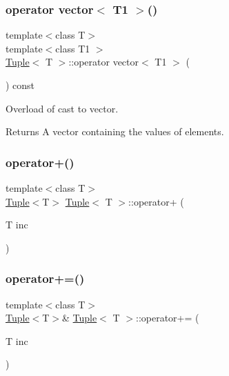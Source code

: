 \mbox{\label{class_tuple_a924a25df1578ffab148c69a1a1000491}} 
\subsubsection{\texorpdfstring{operator vector$<$ T1 $>$()}{operator vector< T1 >()}}
{\footnotesize\ttfamily template$<$class T$>$ \\
template$<$class T1 $>$ \\
\mbox{\hyperlink{class_tuple}{Tuple}}$<$ T $>$\+::operator vector$<$ T1 $>$ (\begin{DoxyParamCaption}{ }\end{DoxyParamCaption}) const\hspace{0.3cm}{\ttfamily [inline]}}



Overload of cast to vector. 

\begin{DoxyReturn}{Returns}
A vector containing the values of elements. 
\end{DoxyReturn}
\mbox{\label{class_tuple_af41b573429ba5d8fc0b5576b7b41e818}} 
\subsubsection{\texorpdfstring{operator+()}{operator+()}}
{\footnotesize\ttfamily template$<$class T$>$ \\
\mbox{\hyperlink{class_tuple}{Tuple}}$<$T$>$ \mbox{\hyperlink{class_tuple}{Tuple}}$<$ T $>$\+::operator+ (\begin{DoxyParamCaption}\item[{T}]{inc }\end{DoxyParamCaption})\hspace{0.3cm}{\ttfamily [inline]}}

\mbox{\label{class_tuple_aeace0f594f48529ddf3385cb2f023daf}} 
\subsubsection{\texorpdfstring{operator+=()}{operator+=()}}
{\footnotesize\ttfamily template$<$class T$>$ \\
\mbox{\hyperlink{class_tuple}{Tuple}}$<$T$>$\& \mbox{\hyperlink{class_tuple}{Tuple}}$<$ T $>$\+::operator+= (\begin{DoxyParamCaption}\item[{T}]{inc }\end{DoxyParamCaption})\hspace{0.3cm}{\ttfamily [inline]}}


